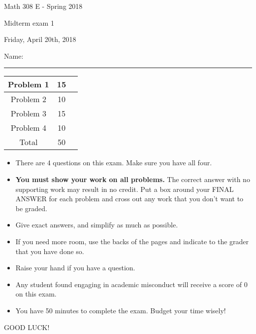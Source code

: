 \documentclass[12 pt]{report}
\begin{document}
\noindent \vfill \noindent \large

\centerline{Math 308 E - Spring 2018}

\centerline{Midterm exam 1}

\centerline{Friday, April 20th, 2018}

\normalsize

\vfill
\medskip
Name: \rule{10cm}{1pt}

\bigskip

\vfill
\begin{center}
{\large
\begin{tabular}{||c|c|r||}
\hline Problem 1 & 15 & \hspace{10mm} \hfill \\
\hline Problem 2 & 10 & \hspace{10mm} \hfill \\
\hline Problem 3 & 15 & \hspace{10mm} \hfill \\
\hline Problem 4 & 10 & \hspace{10mm} \hfill \\
\hline Total & 50 & \hspace{10mm} \hfill \\
\hline
\end{tabular}
}
\end{center}
\vfill
\begin{itemize}
\item There are 4 questions on this exam. Make sure you have all four.
\item \textbf{You must show your work on all problems.}  The correct answer
with no supporting work may result in no credit. Put a box
around your FINAL ANSWER for each problem and cross out any work
that you don't want to be graded.
\item Give exact answers, and simplify as much as possible. 
\item If you need more room, use the backs
of the pages and indicate to the grader that you have done so.
\item Raise your hand if you have a question.
\item Any student found engaging in academic misconduct will receive
a score of 0 on this exam.
\item You have 50 minutes to complete the exam.  Budget your time wisely! \\
\end{itemize}
\vfill
\begin{center}GOOD LUCK!\end{center}
\end{document}
